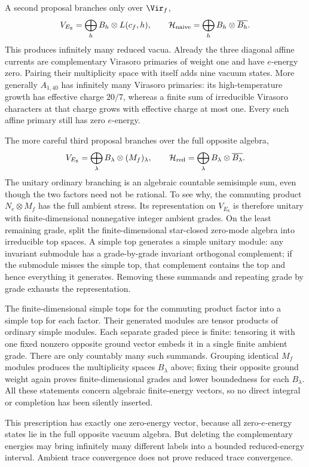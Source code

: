 A second proposal branches only over $\Vir_f$,
\[
 V_{E_8}=\bigoplus_h B_h\otimes L(c_f,h),
 \qquad\mathcal H_{\rm naive}=\bigoplus_hB_h\otimes\overline{B_h}.
\]
This produces infinitely many reduced vacua. Already the three
diagonal affine currents are complementary Virasoro primaries of
weight one and have $e$-energy zero. Pairing their multiplicity space
with itself adds nine vacuum states. More generally $A_{1,40}$ has
infinitely many Virasoro primaries: its high-temperature growth has
effective charge $20/7$, whereas a finite sum of irreducible
Virasoro characters at that charge grows with effective charge at
most one. Every such affine primary still has zero $e$-energy.

The more careful third proposal branches over the full opposite
algebra,
\[
 V_{E_8}=\bigoplus_\lambda B_\lambda\otimes(M_f)_\lambda,
 \qquad\mathcal H_{\rm red}
      =\bigoplus_\lambda B_\lambda\otimes\overline{B_\lambda}.
\]
The unitary ordinary branching is an algebraic countable semisimple
sum, even though the two factors need not be rational. To see why,
the commuting product $N_e\otimes M_f$ has the full ambient stress.
Its representation on $V_{E_8}$ is therefore unitary with
finite-dimensional nonnegative integer ambient grades. On the
least remaining grade, split the finite-dimensional star-closed
zero-mode algebra into irreducible top spaces. A simple top
generates a simple unitary module: any invariant submodule has a
grade-by-grade invariant orthogonal complement; if the submodule
misses the simple top, that complement contains the top and hence
everything it generates. Removing these summands and repeating
grade by grade exhausts the representation.

The finite-dimensional simple tops for the commuting product
factor into a simple top for each factor. Their generated modules
are tensor products of ordinary simple modules. Each separate
graded piece is finite: tensoring it with one fixed nonzero
opposite ground vector embeds it in a single finite ambient grade.
There are only countably many such summands. Grouping identical
$M_f$ modules produces the multiplicity spaces $B_\lambda$ above;
fixing their opposite ground weight again proves finite-dimensional
grades and lower boundedness for each $B_\lambda$. All these
statements concern algebraic finite-energy vectors, so no direct
integral or completion has been silently inserted.

This prescription has exactly one zero-energy vector, because
all zero-$e$-energy states lie in the full opposite vacuum algebra.
But deleting the complementary energies may bring infinitely many
different labels into a bounded reduced-energy interval. Ambient
trace convergence does not prove reduced trace convergence.

